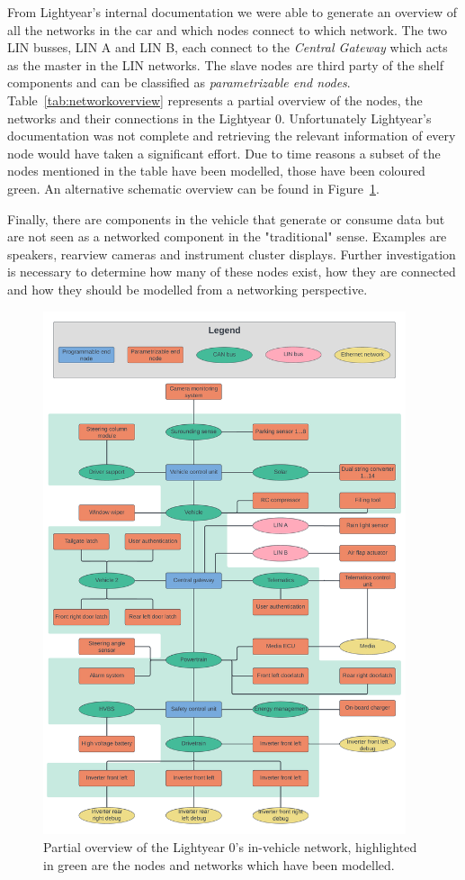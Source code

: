 From Lightyear's internal documentation we were able to generate an overview of all the networks in the car and which nodes connect to which network. The two LIN busses, LIN A and LIN B, each connect to the \textit{Central Gateway} which acts as the master in the LIN networks. The slave nodes are third party of the shelf components and can be classified as \textit{parametrizable end nodes}. Table~\ref{tab:networkoverview} represents a partial overview of the nodes, the networks and their connections in the Lightyear 0. Unfortunately Lightyear's documentation was not complete and retrieving the relevant information of every node would have taken a significant effort. Due to time reasons a subset of the nodes mentioned in the table have been modelled, those have been coloured green. An alternative schematic overview can be found in Figure~\ref{fig:networkoverview}.

Finally, there are components in the vehicle that generate or consume data but are not seen as a networked component in the "traditional" sense. Examples are speakers, rearview cameras and instrument cluster displays. Further investigation is necessary to determine how many of these nodes exist, how they are connected and how they should be modelled from a networking perspective.


\begin{figure}[htb]
    \centering
    \includegraphics[width=0.95\textwidth]{images/Network_overview.png}
    \caption{Partial overview of the Lightyear 0's in-vehicle network, highlighted in green are the nodes and networks which have been modelled.}
    \label{fig:networkoverview}
\end{figure}
\clearpage